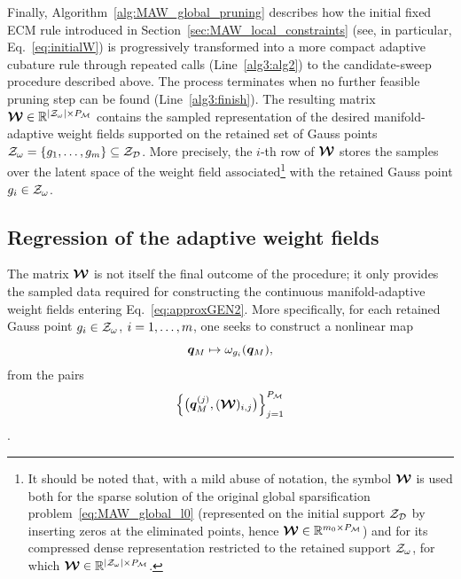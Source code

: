\documentclass[preprint,10pt]{elsarticle}  %
\begin{document}
Finally, Algorithm~\ref{alg:MAW_global_pruning} describes how the initial
fixed ECM rule introduced in
Section~\ref{sec:MAW_local_constraints} (see, in particular,
Eq.~\eqref{eq:initialW}) is progressively transformed into a more compact
 adaptive cubature rule through repeated calls
(Line~\ref{alg3:alg2}) to the candidate-sweep procedure described above. The process terminates when no further feasible
pruning step can be found (Line~\ref{alg3:finish}). The resulting matrix
\(
\boldsymbol{\mathcal{W}}\in\mathbb{R}^{|\mathcal{Z}_{\omega}|\times P_{\mathcal{M}}}
\)
contains the sampled representation of the desired manifold-adaptive weight
fields supported on the retained set of Gauss points
\(\mathcal{Z}_{\omega}=\{g_1,\ldots,g_{m}\}\subseteq\mathcal{Z}_{\mathcal{D}}\). More precisely, the
\(i\)-th row of \(\boldsymbol{\mathcal{W}}\) stores the samples over the latent space of the
 weight field associated\footnote{It should be noted that, with a mild
abuse of notation, the symbol \(\boldsymbol{\mathcal{W}}\) is used both for the sparse
solution of the original global sparsification
problem~\eqref{eq:MAW_global_l0} (represented on the initial support
\(\mathcal{Z}_{\mathcal{D}}\) by inserting zeros at the eliminated points, hence
\(\boldsymbol{\mathcal{W}}\in\mathbb{R}^{m_0\times P_{\mathcal{M}}}\)) and for its compressed dense
representation restricted to the retained support \(\mathcal{Z}_{\omega}\), for which
\(\boldsymbol{\mathcal{W}}\in\mathbb{R}^{|\mathcal{Z}_{\omega}|\times P_{\mathcal{M}}}\).}  with the retained Gauss point \(g_i\in\mathcal{Z}_{\omega}\).
%



\subsection{Regression of the adaptive weight fields}
\label{sec:regression}
The matrix \(\boldsymbol{\mathcal{W}}\) is not itself the final outcome of the procedure; it
only provides the sampled data required for constructing the continuous
manifold-adaptive weight fields entering
Eq.~\eqref{eq:approxGEN2}. More specifically, for each retained Gauss
point \(g_i\in\mathcal{Z}_{\omega}\), \(i=1,\ldots,m\), one seeks to construct a nonlinear map
\begin{equation}
\label{eq:3dssdddd}
    \bm{q}_M
    \mapsto
    \omega_{g_i}(\bm{q}_M),
\end{equation}
from the pairs
\begin{equation}
\label{eq:pairs}
  \left\{
    \big(\bm{q}_M^{(j)},(\boldsymbol{\mathcal{W}})_{i,j}\big)
    \right\}_{j=1}^{P_{\mathcal{M}}}
\end{equation}.
\end{document}
